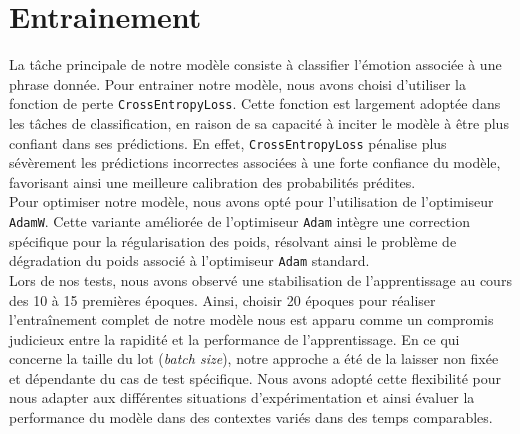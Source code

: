 \documentclass{article}
\begin{document}
\section{Entrainement}
La tâche principale de notre modèle consiste à classifier l'émotion associée à une phrase donnée. Pour entrainer notre modèle, nous avons choisi d'utiliser la fonction de perte \texttt{CrossEntropyLoss}. Cette fonction est largement adoptée dans les tâches de classification, en raison de sa capacité à inciter le modèle à être plus confiant dans ses prédictions. En effet, \texttt{CrossEntropyLoss} pénalise plus sévèrement les prédictions incorrectes associées à une forte confiance du modèle, favorisant ainsi une meilleure calibration des probabilités prédites. \\
Pour optimiser notre modèle, nous avons opté pour l'utilisation de l'optimiseur \texttt{AdamW}. Cette variante améliorée de l'optimiseur \texttt{Adam} intègre une correction spécifique pour la régularisation des poids, résolvant ainsi le problème de dégradation du poids associé à l'optimiseur \texttt{Adam} standard. \\
Lors de nos tests, nous avons observé une stabilisation de l'apprentissage au cours des 10 à 15 premières époques. Ainsi, choisir 20 époques pour réaliser l'entraînement complet de notre modèle nous est apparu comme un compromis judicieux entre la rapidité et la performance de l'apprentissage. En ce qui concerne la taille du lot (\textit{batch size}), notre approche a été de la laisser non fixée et dépendante du cas de test spécifique. Nous avons adopté cette flexibilité pour nous adapter aux différentes situations d'expérimentation et ainsi évaluer la performance du modèle dans des contextes variés dans des temps comparables.
\end{document}
